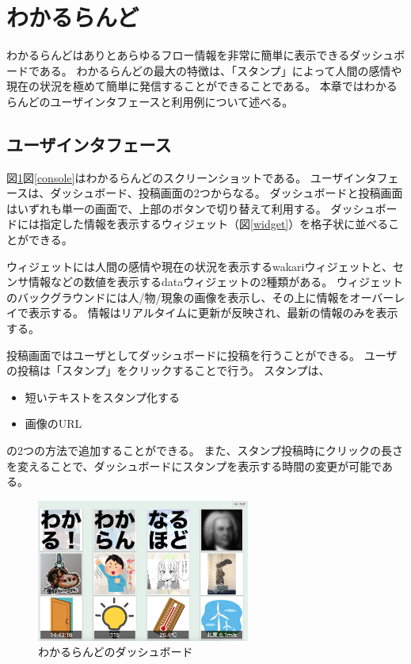 \section{わかるらんど}

わかるらんどはありとあらゆるフロー情報を非常に簡単に表示できるダッシュボードである。
わかるらんどの最大の特徴は、「スタンプ」によって人間の感情や現在の状況を極めて簡単に発信することができることである。
本章ではわかるらんどのユーザインタフェースと利用例について述べる。

\subsection{ユーザインタフェース}

図\ref{dashboard}図\ref{console}はわかるらんどのスクリーンショットである。
ユーザインタフェースは、ダッシュボード、投稿画面の2つからなる。
ダッシュボードと投稿画面はいずれも単一の画面で、上部のボタンで切り替えて利用する。
ダッシュボードには指定した情報を表示するウィジェット（図\ref{widget}）を格子状に並べることができる。

ウィジェットには人間の感情や現在の状況を表示するwakariウィジェットと、センサ情報などの数値を表示するdataウィジェットの2種類がある。
ウィジェットのバックグラウンドには人/物/現象の画像を表示し、その上に情報をオーバーレイで表示する。
情報はリアルタイムに更新が反映され、最新の情報のみを表示する。

投稿画面ではユーザとしてダッシュボードに投稿を行うことができる。
ユーザの投稿は「スタンプ」をクリックすることで行う。
スタンプは、
\begin{itemize}
\item 短いテキストをスタンプ化する
\item 画像のURL
\end{itemize}
の2つの方法で追加することができる。
また、スタンプ投稿時にクリックの長さを変えることで、ダッシュボードにスタンプを表示する時間の変更が可能である。

\begin{figure}[h]
\centering
\includegraphics[width=7cm]{images/dashboard.eps}
\caption{わかるらんどのダッシュボード}
\label{dashboard}
\end{figure}

